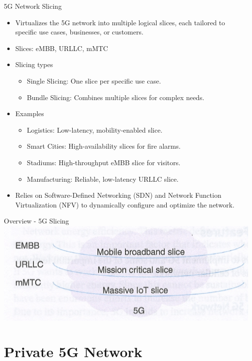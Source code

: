 \documentclass{beamer}
\begin{document}
\begin{frame}{5G Network Slicing}
  \begin{itemize}
    \item Virtualizes the 5G network into multiple logical slices, each tailored to specific use cases, businesses, or customers.
    \item Slices: eMBB, URLLC, mMTC
    \item Slicing types
    \begin{itemize}
        \item Single Slicing: One slice per specific use case.
        \item Bundle Slicing: Combines multiple slices for complex needs.
    \end{itemize}
    \item Examples
    \begin{itemize}
        \item Logistics: Low-latency, mobility-enabled slice.
        \item Smart Cities: High-availability slices for fire alarms.
        \item Stadiums: High-throughput eMBB slice for visitors.
        \item Manufacturing: Reliable, low-latency URLLC slice.
    \end{itemize}
    \item Relies on Software-Defined Networking (SDN) and Network Function Virtualization (NFV) to dynamically configure and optimize the network.
  \end{itemize}
\end{frame}

\begin{frame}{Overview - 5G Slicing}
  \hspace*{0.6em}
  \includegraphics[scale=0.6]{fig/5g_slices.png}
\end{frame}

\section[Private 5G Network]{Private 5G Network}
\end{document}
